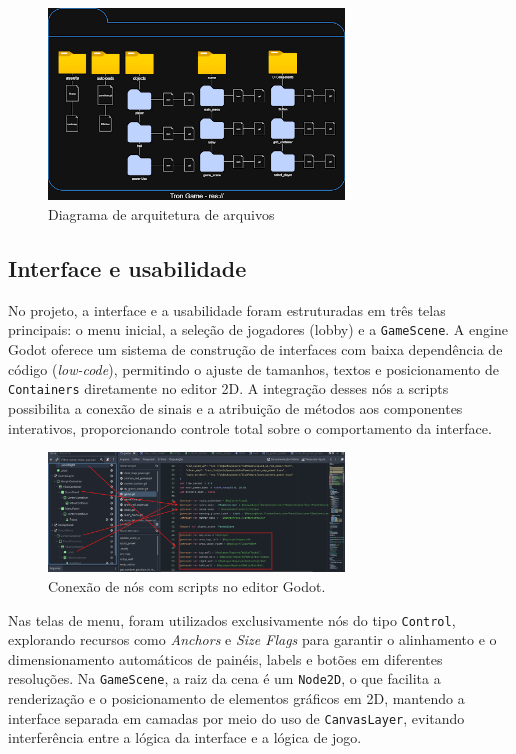 \begin{figure}[htbp]
    \centering
    \caption{Diagrama de arquitetura de arquivos}
    \label{fig:diagrama-arquitetura-arquivos}
    \includegraphics[width=0.7\textwidth]{figuras/diagrama-arquivos.png}
\end{figure}

\subsection{Interface e usabilidade}

No projeto, a interface e a usabilidade foram estruturadas em três telas principais: o menu inicial, a seleção de jogadores (lobby) e a \texttt{GameScene}. A engine Godot oferece um sistema de construção de interfaces com baixa dependência de código (\textit{low-code}), permitindo o ajuste de tamanhos, textos e posicionamento de \texttt{Containers} diretamente no editor 2D. A integração desses nós a scripts possibilita a conexão de sinais e a atribuição de métodos aos componentes interativos, proporcionando controle total sobre o comportamento da interface.

\begin{figure}[htbp]
    \centering
    \caption{Conexão de nós com scripts no editor Godot.}
    \label{fig:conexao-nos}
    \includegraphics[width=0.7\textwidth]{figuras/conexoes-nos.png}
\end{figure}

Nas telas de menu, foram utilizados exclusivamente nós do tipo \texttt{Control}, explorando recursos como \textit{Anchors} e \textit{Size Flags} para garantir o alinhamento e o dimensionamento automáticos de painéis, labels e botões em diferentes resoluções. Na \texttt{GameScene}, a raiz da cena é um \texttt{Node2D}, o que facilita a renderização e o posicionamento de elementos gráficos em 2D, mantendo a interface separada em camadas por meio do uso de \texttt{CanvasLayer}, evitando interferência entre a lógica da interface e a lógica de jogo.


